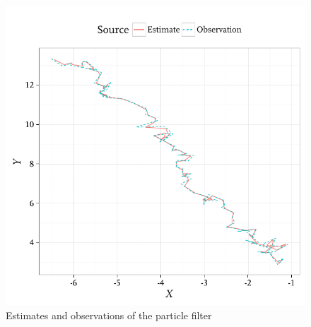 \begin{figure}
  \includegraphics{fig/pf}
  \caption{Estimates and observations of the particle filter}
  \label{fig:pf}
\end{figure}
